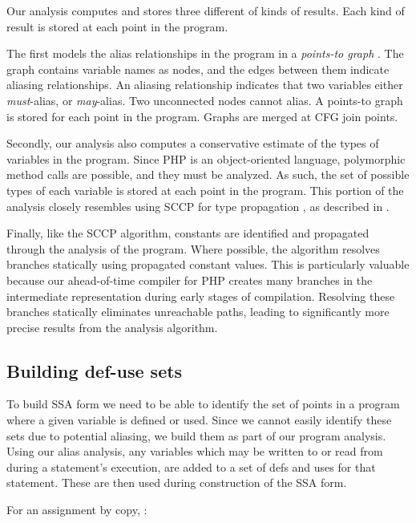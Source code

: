 Our analysis computes and stores three different of kinds of results.
Each kind of result is stored at each point in the program.

The first models the alias relationships in the program in a
\textit{points-to graph} \cite{EGH1994}.  The graph contains variable
names as nodes, and the edges between them indicate aliasing
relationships.  An aliasing relationship indicates that two variables
either \textit{must}-alias, or \textit{may}-alias.  Two unconnected
nodes cannot alias.  A points-to graph is stored for each point in the
program.  Graphs are merged at CFG join points.

Secondly, our analysis also computes a conservative estimate of the
types of variables in the program.  Since PHP is an object-oriented
language, polymorphic method calls are possible, and they must be
analyzed.  As such, the set of possible types of each variable is
stored at each point in the program.  This portion of the analysis
closely resembles using SCCP for type propagation \cite{Lenart2000},
as described in .

Finally, like the SCCP algorithm, constants are identified and
propagated through the analysis of the program. Where possible, the
algorithm resolves branches statically using propagated constant
values. This is particularly valuable because our \phc ahead-of-time
compiler for PHP creates many branches in the intermediate
representation during early stages of compilation.  Resolving these
branches statically eliminates unreachable paths, leading to
significantly more precise results from the analysis algorithm.


\subsection{Building def-use sets}

To build SSA form we need to be able to identify the set of points in
a program where a given variable is defined or used. Since we cannot
easily identify these sets due to potential aliasing, we build them as
part of our program analysis.  Using our alias analysis, any variables
which may be written to or read from during a statement's execution,
are added to a set of defs and uses for that statement.  These are
then used during construction of the SSA form.

For an assignment by copy, :

